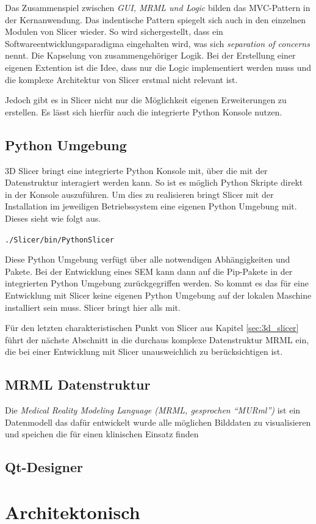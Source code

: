 Das Zusammenspiel zwischen \textit{GUI, MRML und Logic} bilden das MVC-Pattern
in der Kernanwendung. Das indentische Pattern spiegelt sich auch in den einzelnen
Modulen von Slicer wieder. So wird sichergestellt, dass ein Softwareentwicklungsparadigma
eingehalten wird, was sich \textit{separation of concerns} nennt. Die Kapselung
von zusammengehöriger Logik. Bei der Erstellung einer eigenen Extention ist die Idee,
dass nur die Logic implementiert werden muss und die komplexe Architektur von
Slicer erstmal nicht relevant ist.

Jedoch gibt es in Slicer nicht nur die Möglichkeit eigenen Erweiterungen zu
erstellen. Es lässt sich hierfür auch die integrierte Python Konsole nutzen.

\subsection{Python Umgebung}
\label{subsec:pythob_umgebung} 3D Slicer bringt eine integrierte Python Konsole mit,
über die mit der Datenstruktur interagiert werden kann. So ist es möglich Python
Skripte direkt in der Konsole auszuführen. Um dies zu realisieren bringt Slicer
mit der Installation im jeweiligen Betriebssystem eine eigenen Python Umgebung
mit. Dieses sieht wie folgt aus.

\texttt{./Slicer/bin/PythonSlicer}

Diese Python Umgebung verfügt über alle notwendigen Abhängigkeiten und Pakete.
Bei der Entwicklung eines SEM kann dann auf die Pip-Pakete in der integrierten
Python Umgebung zurückgegriffen werden. So kommt es das für eine Entwicklung mit
Slicer keine eigenen Python Umgebung auf der lokalen Maschine installiert sein muss.
Slicer bringt hier alls mit.

Für den letzten charakteristischen Punkt von Slicer aus Kapitel
\ref{sec:3d_slicer} führt der nächste Abschnitt in die durchaus komplexe
Datenstruktur MRML ein, die bei einer Entwicklung mit Slicer unausweichlich zu berücksichtigen
ist.

\subsection{MRML Datenstruktur}
\label{subsec:mrml_datenstruktur} Die \textit{Medical Reality Modeling Language
(MRML, gesprochen “MURml”)} ist ein Datenmodell das dafür entwickelt wurde alle
möglichen Bilddaten zu visualisieren und speichen die für einen klinischen
Einsatz finden \citep[vgl.][]{slicer2024}

\subsection{Qt-Designer}

\section{Architektonisch}
\label{sec:architektonisch}